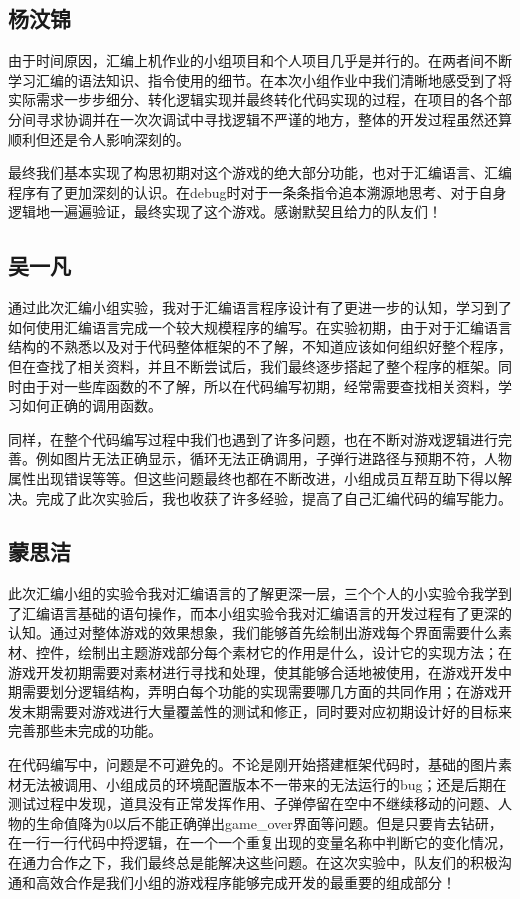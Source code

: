 \subsection{杨汶锦}
由于时间原因，汇编上机作业的小组项目和个人项目几乎是并行的。在两者间不断学习汇编的语法知识、指令使用的细节。在本次小组作业中我们清晰地感受到了将实际需求一步步细分、转化逻辑实现并最终转化代码实现的过程，在项目的各个部分间寻求协调并在一次次调试中寻找逻辑不严谨的地方，整体的开发过程虽然还算顺利但还是令人影响深刻的。
\par
最终我们基本实现了构思初期对这个游戏的绝大部分功能，也对于汇编语言、汇编程序有了更加深刻的认识。在debug时对于一条条指令追本溯源地思考、对于自身逻辑地一遍遍验证，最终实现了这个游戏。感谢默契且给力的队友们！
\subsection{吴一凡}
通过此次汇编小组实验，我对于汇编语言程序设计有了更进一步的认知，学习到了如何使用汇编语言完成一个较大规模程序的编写。在实验初期，由于对于汇编语言结构的不熟悉以及对于代码整体框架的不了解，不知道应该如何组织好整个程序，但在查找了相关资料，并且不断尝试后，我们最终逐步搭起了整个程序的框架。同时由于对一些库函数的不了解，所以在代码编写初期，经常需要查找相关资料，学习如何正确的调用函数。
\par
同样，在整个代码编写过程中我们也遇到了许多问题，也在不断对游戏逻辑进行完善。例如图片无法正确显示，循环无法正确调用，子弹行进路径与预期不符，人物属性出现错误等等。但这些问题最终也都在不断改进，小组成员互帮互助下得以解决。完成了此次实验后，我也收获了许多经验，提高了自己汇编代码的编写能力。
\subsection{蒙思洁}
此次汇编小组的实验令我对汇编语言的了解更深一层，三个个人的小实验令我学到了汇编语言基础的语句操作，而本小组实验令我对汇编语言的开发过程有了更深的认知。通过对整体游戏的效果想象，我们能够首先绘制出游戏每个界面需要什么素材、控件，绘制出主题游戏部分每个素材它的作用是什么，设计它的实现方法；在游戏开发初期需要对素材进行寻找和处理，使其能够合适地被使用，在游戏开发中期需要划分逻辑结构，弄明白每个功能的实现需要哪几方面的共同作用；在游戏开发末期需要对游戏进行大量覆盖性的测试和修正，同时要对应初期设计好的目标来完善那些未完成的功能。
\par
在代码编写中，问题是不可避免的。不论是刚开始搭建框架代码时，基础的图片素材无法被调用、小组成员的环境配置版本不一带来的无法运行的bug；还是后期在测试过程中发现，道具没有正常发挥作用、子弹停留在空中不继续移动的问题、人物的生命值降为0以后不能正确弹出game\_over界面等问题。但是只要肯去钻研，在一行一行代码中捋逻辑，在一个一个重复出现的变量名称中判断它的变化情况，在通力合作之下，我们最终总是能解决这些问题。在这次实验中，队友们的积极沟通和高效合作是我们小组的游戏程序能够完成开发的最重要的组成部分！
